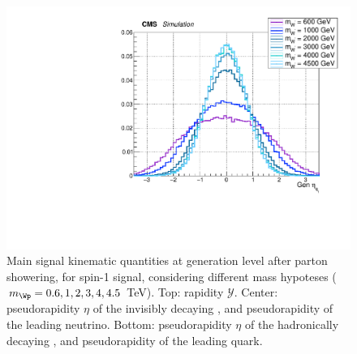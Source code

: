 \begin{figure}[!htb]
\begin{center}
     \includegraphics[width=.495\textwidth]{Gen_v9/XWZInv_g_Had1Eta.pdf}%
   \end{center}
   \caption{Main signal kinematic quantities at generation level after parton showering, for spin-1 \Wp signal, considering different mass hypoteses ($m_{\Wp} = 0.6, 1, 2, 3, 4, 4.5$ TeV). Top: \Wp rapidity $\mathcal{Y}$. Center: pseudorapidity $\eta$ of the invisibly decaying \Z, and pseudorapidity of the leading neutrino. Bottom: pseudorapidity $\eta$ of the hadronically decaying \W, and pseudorapidity of the leading quark.}
   \label{fig:genWprimeSignal2}
 \end{figure}


